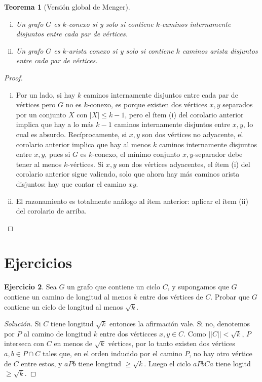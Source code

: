 \documentclass[12pt]{report}
\theoremstyle{plain}
\newtheorem{theorem}{Teorema}[section]
\theoremstyle{definition}
\newtheorem{exercise}[theorem]{Ejercicio}
\newenvironment{solution}{\begin{proof}[Solución]}{\end{proof}}
\newcommand{\abs}[1]{\left \vert #1 \right \vert}
\newcommand{\Abs}[1]{\left \vert \left \vert #1 \right \vert \right \vert}
\begin{document}
\begin{theorem}[Versión global de Menger]\label{th:version global de Menger}
\begin{enumerate}[(i)]
\item Un grafo $G$ es $k$-conexo si y solo si contiene $k$-caminos internamente disjuntos entre cada par de vértices.
\item Un grafo $G$ es $k$-arista conexo si y solo si contiene $k$ caminos arista disjuntos entre cada par de vértices.
\end{enumerate}
\end{theorem}
\begin{proof}
\begin{enumerate}[(i)]
\item Por un lado, si hay $k$ caminos internamente disjuntos entre cada par de vértices pero $G$ no es $k$-conexo, es porque existen dos vértices $x,y$ separados por un conjunto $X$ con $\abs X \leq k-1$, pero el ítem (i) del corolario anterior implica que hay a lo más $k-1$ caminos internamente disjuntos entre $x,y$, lo cual es absurdo. Recíprocamente, si $x,y$ son dos vértices no adyacente, el corolario anterior implica que hay al menos $k$ caminos internamente disjuntos entre $x,y$, pues si $G$ es $k$-conexo, el mínimo conjunto $x,y$-separador debe tener al menos $k$-vértices. Si $x,y$ son dos vértices adyacentes, el ítem (i) del corolario anterior sigue valiendo, solo que ahora hay más caminos arista disjuntos: hay que contar el camino $xy$.

\item El razonamiento es totalmente análogo al ítem anterior: aplicar el ítem (ii) del corolario de arriba.
\end{enumerate}
\end{proof}





\section{Ejercicios}

\begin{exercise}
Sea $G$ un grafo que contiene un ciclo $C$, y supongamos que $G$ contiene un camino de longitud al menos $k$ entre
dos vértices de $C$. Probar que $G$ contiene un ciclo de longitud al menos $\sqrt k$.
\end{exercise}
\begin{solution}
Si $C$ tiene longitud $\sqrt k$ entonces la afirmación vale. Si no, denotemos por $P$ al camino de longitud $k$
entre dos vérticces $x,y \in C$. Como $\Abs C < \sqrt k$, $P$ interseca con $C$ en menos de $\sqrt k$ vértices,
por lo tanto existen dos vértices $a,b \in P \cap C$ tales que, en el orden inducido por el camino $P$, no hay otro
vértice de $C$ entre estos, y $a P b$ tiene longitud $\geq \sqrt k$. Luego el ciclo $a P b C a$ tiene logitd $\geq \sqrt k$.
\end{solution}
\end{document}

